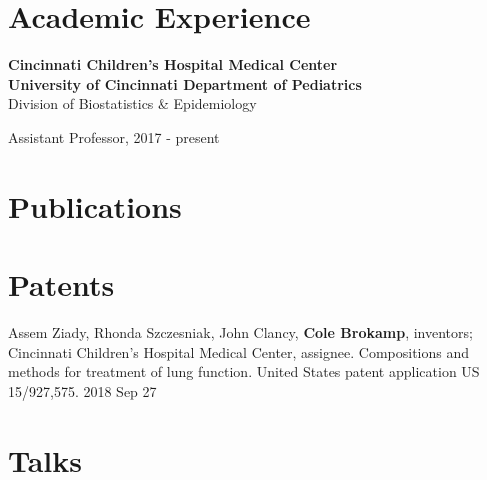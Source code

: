 \documentclass[margin,line]{res}
\newenvironment{list1}{
  \begin{list}{\ding{113}}{%
      \setlength{\itemsep}{0in}
      \setlength{\parsep}{0in} \setlength{\parskip}{0in}
      \setlength{\topsep}{0in} \setlength{\partopsep}{0in}
      \setlength{\leftmargin}{0.17in}}}{\end{list}}
\newenvironment{list3}{
  \begin{list}{}{%
      \setlength{\itemsep}{0in}
      \setlength{\parsep}{0in} \setlength{\parskip}{0in}
      \setlength{\topsep}{0in} \setlength{\partopsep}{0in}
      \setlength{\leftmargin}{0in}}}{\end{list}}
\begin{document}
\begin{resume}
\section{\sc Academic Experience}

{\bf Cincinnati Children's Hospital Medical Center}\\
{\bf University of Cincinnati Department of Pediatrics}\\
Division of Biostatistics \& Epidemiology\\
\vspace*{-.1in}
\begin{list1}
    \item[] Assistant Professor, 2017 - present
\end{list1}

\section{\sc Publications}


\section{\sc Patents}
Assem Ziady, Rhonda Szczesniak, John Clancy, \textbf{Cole Brokamp}, inventors; Cincinnati Children's Hospital Medical Center, assignee. Compositions and methods for treatment of lung function. United States patent application US 15/927,575. 2018 Sep 27

\section{\sc Talks}





\end{resume}
\end{document}
